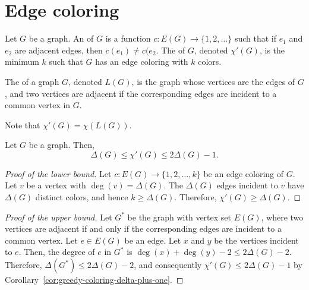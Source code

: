 \section{Edge coloring}

\begin{definition}
    Let \(G\) be a graph.
    An  of \(G\) is a function
    \(
        c \colon E(G) \to \{1, 2, \ldots\}
    \)
    such that if \(e_1\) and \(e_2\) are adjacent edges,
    then \(c(e_1) \neq c(e_2\).
    The  of \(G\),
    denoted \(\chi'(G)\),
    is the minimum \(k\) such that \(G\) has an edge coloring with \(k\) colors.
\end{definition}

\begin{definition}
    The  of a graph \(G\), denoted \(L(G)\), is the graph whose vertices are the edges of \(G\), and two vertices are adjacent if the corresponding edges are incident to a common vertex in \(G\).
\end{definition}

Note that \(\chi'(G) = \chi(L(G))\).

\begin{proposition} \label{prop:easy-bounds-edge-coloring}
    Let \(G\) be a graph.
    Then,
    \begin{equation}
        \Delta(G) \leq \chi'(G) \leq 2\Delta(G) - 1.
    \end{equation}
\end{proposition}

\begin{proof}[Proof of the lower bound]
    Let \(c \colon E(G) \to \{1, 2, \ldots, k\}\) be an edge coloring of \(G\).
    Let \(v\) be a vertex with \(\deg(v) = \Delta(G)\).
    The \(\Delta(G)\) edges incident to \(v\) have \(\Delta(G)\) distinct colors,
    and hence \(k \geq \Delta(G)\).
    Therefore, \(\chi'(G) \geq \Delta(G)\).
\end{proof}

\begin{proof}[Proof of the upper bound]
    Let \(G^*\) be the graph with vertex set \(E(G)\),
    where two vertices are adjacent if and only if the corresponding edges are incident to a common vertex.
    Let \(e \in E(G)\) be an edge.
    Let \(x\) and \(y\) be the vertices incident to \(e\).
    Then, the degree of \(e\) in \(G^*\) is \(\deg(x) + \deg(y) - 2 \leq 2\Delta(G) - 2\).
    Therefore, \(\Delta(G^*) \leq 2\Delta(G) - 2\),
    and consequently \(\chi'(G) \leq 2\Delta(G) - 1\) by Corollary~\ref{cor:greedy-coloring-delta-plus-one}.
\end{proof}

